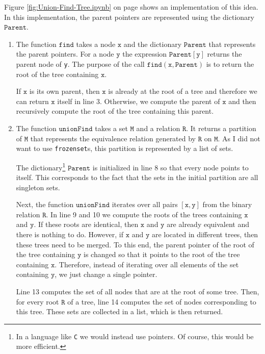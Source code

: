 Figure \ref{fig:Union-Find-Tree.ipynb} on page \pageref{fig:Union-Find-Tree.ipynb} shows an
implementation of this idea.  In this implementation, the parent pointers are represented using the
dictionary $\texttt{Parent}$.  
\begin{enumerate}
\item The function $\texttt{find}$ takes a node $\texttt{x}$ and the dictionary $\texttt{Parent}$ 
      that represents the parent pointers.  For a node $\texttt{y}$ the expression
      $\texttt{Parent}[\texttt{y}]$ returns the parent node of \texttt{y}.
      The purpose of the call $\texttt{find}(\texttt{x}, \texttt{Parent})$ is to
      return the root of the tree containing $\texttt{x}$.

      If $\texttt{x}$ is its own parent, then $\texttt{x}$ is already at the root of a tree and therefore 
      we can return $\texttt{x}$ itself in line 3.
      Otherwise, we compute the parent of $\texttt{x}$ and then recursively compute the root of the tree
      containing this parent.  
\item The function $\texttt{unionFind}$ takes a set $\texttt{M}$ and a relation $\texttt{R}$.  It returns
      a partition of $\texttt{M}$ that represents the equivalence relation generated by $\texttt{R}$ on
      $\texttt{M}$.  As I did not want to use \texttt{frozenset}s, this partition is represented by a list of
      sets. 

      The dictionary\footnote{
        In a language like \texttt{C} we would instead use pointers.  Of course, this would be more efficient.
      } $\texttt{Parent}$ is initialized in line 8 so that every node
      points to itself.   This corresponds to the fact that the sets in the initial partition are all
      singleton sets.  

      Next, the function $\texttt{unionFind}$ iterates over all pairs $[\texttt{x}, \texttt{y}]$ from the binary
      relation $\texttt{R}$.  In line 9 and 10 we compute the roots of the trees containing $\texttt{x}$ and
      $\texttt{y}$.  If these roots are identical, then $\texttt{x}$ and $\texttt{y}$ are already
      equivalent and there is nothing to do.  However, if $\texttt{x}$ and $\texttt{y}$ are located 
      in different trees, then these trees need to be merged.  To this end, the parent pointer of
      the root of the tree containing $\texttt{y}$ is changed so that it 
      points to the root of the tree containing $\texttt{x}$.  Therefore, instead of iterating over all
      elements of the set containing $\texttt{y}$, we just change a single pointer.

      Line 13 computes the set of all nodes that are at the root of some tree.  Then, for every root
      $\texttt{R}$ of a tree, line 14 computes the set of nodes corresponding to this tree.
      These sets are collected in a list, which is then returned.
\end{enumerate}


